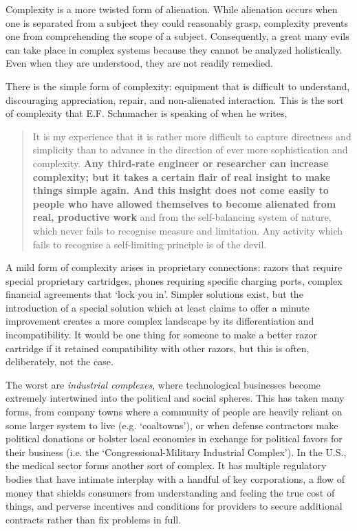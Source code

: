 \documentclass[letterpaper]{article}
\begin{document}
Complexity is a more twisted form of alienation. While alienation occurs when one is separated from a subject they could reasonably grasp, complexity prevents one from comprehending the scope of a subject. Consequently, a great many evils can take place in complex systems because they cannot be analyzed holistically. Even when they are understood, they are not readily remedied.

There is the simple form of complexity: equipment that is difficult to understand, discouraging appreciation, repair, and non-alienated interaction. This is the sort of complexity that E.F. Schumacher is speaking of when he writes,

\begin{quote}
  It is my experience that it is rather more difficult to capture directness and simplicity than to advance in the direction of ever more sophistication and complexity. \textbf{Any third-rate engineer or researcher can increase complexity; but it takes a certain flair of real insight to make things simple again. And this insight does not come easily to people who have allowed themselves to become alienated from real, productive work} and from the self-balancing system of nature, which never fails to recognise measure and limitation. Any activity which fails to recognise a self-limiting principle is of the devil.
\end{quote}

A mild form of complexity arises in proprietary connections: razors that require special proprietary cartridges, phones requiring specific charging ports, complex financial agreements that `lock you in'. Simpler solutions exist, but the introduction of a special solution which at least claims to offer a minute improvement creates a more complex landscape by its differentiation and incompatibility. It would be one thing for someone to make a better razor cartridge if it retained compatibility with other razors, but this is often, deliberately, not the case.

The worst are \textit{industrial complexes}, where technological businesses become extremely intertwined into the political and social spheres. This has taken many forms, from company towns where a community of people are heavily reliant on some larger system to live (e.g. `coaltowns'), or when defense contractors make political donations or bolster local economies in exchange for political favors for their business (i.e. the `Congressional-Military Industrial Complex'). In the U.S., the medical sector forms another sort of complex. It has multiple regulatory bodies that have intimate interplay with a handful of key corporations, a flow of money that shields consumers from understanding and feeling the true cost of things, and perverse incentives and conditions for providers to secure additional contracts rather than fix problems in full.
\end{document}
